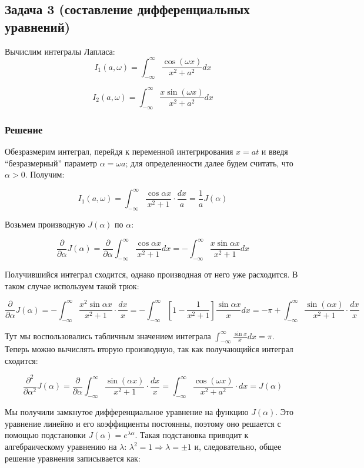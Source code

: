 \documentclass[a4paper,12pt]{article}
\begin{document}
\subsection*{Задача 3 (составление дифференциальных уравнений)}

Вычислим интегралы Лапласа:
\[
I_{1}(a,\omega)=\int_{-\infty}^{\infty}\frac{\cos(\omega x)}{x^{2}+a^{2}}dx
\]


\[
I_{2}(a,\omega)=\int_{-\infty}^{\infty}\frac{x\sin(\omega x)}{x^{2}+a^{2}}dx
\]



\subsubsection*{Решение}

Обезразмерим интеграл, перейдя к переменной интегрирования $x=at$
и введя ``безразмерный'' параметр $\alpha=\omega a$; для определенности
далее будем считать, что $\alpha>0$. Получим:

\[
I_{1}\left(a,\omega\right)=\int_{-\infty}^{\infty}\frac{\cos\alpha x}{x^{2}+1}\cdot\frac{dx}{a}=\frac{1}{a}J(\alpha)
\]

\noindent
Возьмем производную $J(\alpha)$ по $\alpha$:

\[
\frac{\partial}{\partial\alpha}J(\alpha)=\frac{\partial}{\partial\alpha}\int_{-\infty}^{\infty}\frac{\cos\alpha x}{x^{2}+1}dx=-\int_{-\infty}^{\infty}\frac{x\sin\alpha x}{x^{2}+1}dx
\]

\noindent
Получившийся интеграл сходится, однако производная от него уже расходится.
В таком случае используем такой трюк:

\[
\frac{\partial}{\partial\alpha}J(\alpha)=-\int_{-\infty}^{\infty}\frac{x^{2}\sin\alpha x}{x^{2}+1}\cdot\frac{dx}{x}=-\int_{-\infty}^{\infty}\left[1-\frac{1}{x^{2}+1}\right]\frac{\sin\alpha x}{x}dx=-\pi+\int_{-\infty}^{\infty}\frac{\sin(\alpha x)}{x^{2}+1}\cdot\frac{dx}{x}
\]

\noindent
Тут мы воспользовались табличным значением интеграла $\int_{-\infty}^{\infty}\frac{\sin x}{x}dx=\pi$.
Теперь можно вычислять вторую производную, так как получающийся интеграл
сходится:

\[
\frac{\partial^{2}}{\partial\alpha^{2}}J(\alpha)=\frac{\partial}{\partial\alpha}\int_{-\infty}^{\infty}\frac{\sin(\alpha x)}{x^{2}+1}\cdot\frac{dx}{x}=\int_{-\infty}^{\infty}\frac{\cos(\omega x)}{x^{2}+a^{2}}\cdot dx=J(\alpha)
\]

\noindent
Мы получили замкнутое дифференциальное уравнение на функцию $J(\alpha)$.
Это уравнение линейно и его коэффициенты постоянны, поэтому оно
решается с помощью подстановки $J(\alpha)=e^{\lambda\alpha}$. Такая
подстановка приводит к алгебраическому уравнению на $\lambda$: $\lambda^{2}=1\Rightarrow\lambda=\pm1$
и, следовательно, общее решение уравнения записывается как:
\end{document}
